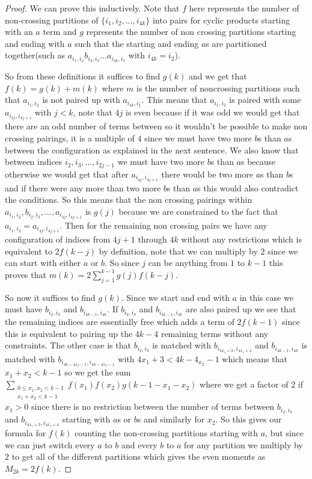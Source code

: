\documentclass[12pt,reqno]{amsart}
\theoremstyle{plain} %
\theoremstyle{remark}
\theoremstyle{definition}
\begin{document}
\begin{proof} We can prove this inductively. Note that $f$ here represents the number of non-crossing partitions of $\{i_1,i_2,...,i_{4k}\}$ into pairs for cyclic products starting with an $a$ term and $g$ represents the number of non crossing partitions starting and ending with $a$ such that the starting and ending $a$s are partitioned together(such as $a_{i_1,i_2}b_{i_2,i_3}...a_{i_{4k},i_1}$ with $i_{4k}=i_2$).

So from these definitions it suffices to find $g(k)$ and we get that $f(k)=g(k) + m(k)$ where $m$ is the number of noncrossing partitions such that $a_{i_1,i_2}$ is not paired up with $a_{i_{4k},i_1}$. This means that $a_{i_1,i_2}$ is paired with some $a_{i_{4j},i_{4j+1}}$ with $j<k$, note that $4j$ is even because if it was odd we would get that there are an odd number of terms between so it wouldn't be possible to make non crossing pairings, it is a multiple of $4$ since we must have two more $b$s than $a$s between the configuration as explained in the next sentence. We also know that between indices $i_2,i_3,...,i_{2j-1}$ we must have two more $b$s than $a$s because otherwise we would get that after $a_{i_{4j},i_{4j+1}}$ there would be two more $a$s than $b$s and if there were any more than two more $b$s than $a$s this would also contradict the conditions. So this means that the non crossing pairings within $a_{i_1,i_2},b_{i_2,i_3},...,a_{i_{4j},i_{4j+1}}$ is $g(j)$ because we are constrained to the fact that $a_{i_1,i_2}=a_{i_{4j},i_{4j+1}}$. Then for the remaining non crossing pairs we have any configuration of indices from $4j+1$ through $4k$ without any restrictions which is equivalent to $2f(k-j)$ by definition, note that we can multiply by $2$ since we can start with either $a$ or $b$. So since $j$ can be anything from $1$ to $k-1$ this proves that $m(k)=2\sum_{j=1}^{k-1}g(j)f(k-j)$.

So now it suffices to find $g(k)$. Since we start and end with $a$ in this case we must have $b_{i_2,i_3}$ and $b_{i_{4k-1},i_{4k}}$. If $b_{i_2,i_3}$ and $b_{i_{4k-1},i_{4k}}$ are also paired up we see that the remaining indices are essentially free which adds a term of $2f(k-1)$ since this is equivalent to pairing up the $4k-4$ remaining terms without any constraints. The other case is that $b_{i_2,i_3}$ is matched with $b_{i_{4x_1+3},i_{4x_1+4}}$ and $b_{i_{4k-1},i_{4k}}$ is matched with $b_{i_{4k-4x_2-1},i_{4k-4x_2-1}}$ with $4x_1+3<4k-4_{x_2}-1$ which means that $x_1+x_2<k-1$ so we get the sum $\sum_{\substack{0\leq x_1,x_2<k-1\\ x_1+x_2<k-1}}f(x_1)f(x_2)g(k-1-x_1-x_2)$ where we get a factor of 2 if $x_1>0$ since there is no restriction between the number of terms between $b_{i_2,i_3}$ and $b_{i_{4x_1+3},i_{4x_1+4}}$ starting with $a$s or $b$s and similarly for $x_2$. So this gives our formula for $f(k)$ counting the non-crossing partitions starting with $a$, but since we can just switch every $a$ to $b$ and every $b$ to $a$ for any partition we multiply by $2$ to get all of the different partitions which gives the even moments as $M_{2k}=2f(k)$.
\end{proof}
\end{document}
